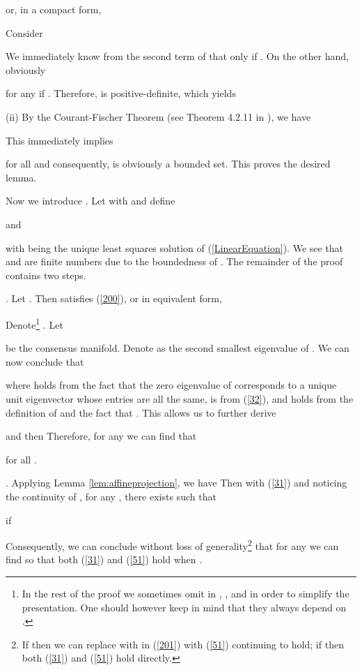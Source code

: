 \documentclass[a4paper, 11pt]{article}
\begin{document}
or, in a compact form,



Consider

We immediately know from the second term of  that   only if .  On the other hand,  obviously

for any  if . Therefore,  is positive-definite, which yields


\noindent(ii) By the Courant-Fischer Theorem (see Theorem 4.2.11 in \cite{horn}), we have

This immediately implies

for all  and consequently,   is obviously a bounded set. This proves the desired lemma. \hfill



Now we introduce  . Let  with  and define

 and
 
 with  being the unique least squares solution of (\ref{LinearEquation}). We see that  and  are finite numbers due to the boundedness of  . The remainder of the proof contains two steps.

 \medskip

 . Let . Then    satisfies  (\ref{200}), or in equivalent form,


 Denote\footnote{In the rest of the proof we sometimes omit  in , , and  in order to simplify the presentation. One should however keep in mind that they always depend on .} . Let
 
be the consensus manifold. Denote  as the second smallest eigenvalue of . We can now conclude that

where   holds from the fact that the zero eigenvalue of  corresponds to a unique unit eigenvector whose entries  are all the same,  is from (\ref{32}), and  holds from the definition of  and the fact that . This allows us to further derive

and then 
Therefore, for any  we can find  that

for all .

. Applying Lemma \ref{lem:affineprojection}, we have 
Then with (\ref{31}) and noticing  the continuity of  , for any , there exists  such that

if

 Consequently, we can conclude without loss of generality\footnote{If  then we can replace  with  in (\ref{201}) with (\ref{51}) continuing to hold; if  then both (\ref{31}) and (\ref{51}) hold directly. } that for any  we can find  so that both  (\ref{31}) and (\ref{51})  hold when  .
\end{document}
